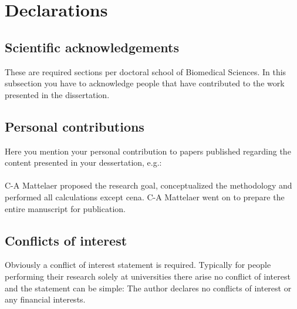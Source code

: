 \chapter{Declarations}
\section{Scientific acknowledgements}
 These are required sections per doctoral school of Biomedical Sciences. In this subsection you have to acknowledge people that have contributed to the work presented in the dissertation.


\section{Personal contributions}

Here you mention your personal contribution to papers published regarding the content presented in your dessertation, e.g.:

\subsubsection{}

C-A Mattelaer proposed the research goal, conceptualized the methodology and performed all calculations except \gls{cena}. C-A Mattelaer went on to prepare the entire manuscript for publication.

\section{Conflicts of interest}

Obviously a conflict of interest statement is required. Typically for people performing their research solely at universities there arise no conflict of interest and the statement can be simple: The author declares no conflicts of interest or any financial interests.